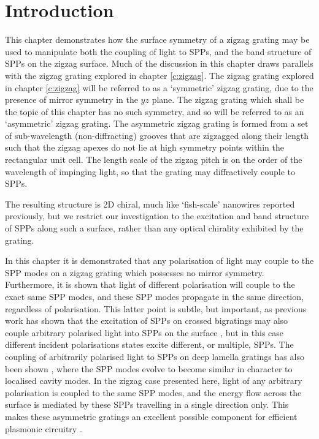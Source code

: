 \section{Introduction\label{sec:asym-intro}}

This chapter demonstrates how the surface symmetry of a zigzag grating may be used to manipulate both the coupling of light to SPPs, and the band structure of SPPs on the zigzag surface. Much of the discussion in this chapter draws parallels with the zigzag grating explored in chapter \ref{c:zigzag}. The zigzag grating explored in chapter \ref{c:zigzag} will be referred to as a `symmetric' zigzag grating, due to the presence of mirror symmetry in the $yz$ plane. The zigzag grating which shall be the topic of this chapter has no such symmetry, and so will be referred to as an `asymmetric' zigzag grating. The asymmetric zigzag grating is formed from a set of sub-wavelength (non-diffracting) grooves that are zigzagged along their length such that the zigzag apexes do not lie at high symmetry points within the rectangular unit cell. The length scale of the zigzag pitch is on the order of the wavelength of impinging light, so that the grating may diffractively couple to SPPs.

The resulting structure is 2D chiral, much like `fish-scale' nanowires reported previously, \cite{Plum2010,Genet2008,Schwanecke2008,Kao2010,Fedotov2007a} but we restrict our investigation to the excitation and band structure of SPPs along such a surface, rather than any optical chirality exhibited by the grating.

In this chapter it is demonstrated that any polarisation of light may couple to the SPP modes on a zigzag grating which possesses no mirror symmetry. Furthermore, it is shown that light of different polarisation will couple to the exact same SPP modes, and these SPP modes propagate in the same direction, regardless of polarisation. This latter point is subtle, but important, as previous work has shown that the excitation of SPPs on crossed bigratings may also couple arbitrary polarised light into SPPs on the surface \cite{Popov2008,Hibbins1998,Watts1996}, but in this case different incident polarisations states excite different, or multiple, SPPs. The coupling of arbitrarily polarised light to SPPs on deep lamella gratings has also been shown \cite{Bonod2008}, where the SPP modes evolve to become similar in character to localised cavity modes. In the zigzag case presented here, light of any arbitrary polarisation is coupled to the same SPP modes, and the energy flow across the surface is mediated by these SPPs travelling in a single direction only. This makes these asymmetric gratings an excellent possible component for efficient plasmonic circuitry \cite{Ozbay2006a}.

